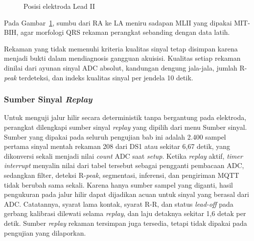 \begin{figure}[!ht]
  \centering
  \caption{Posisi elektroda Lead II}
  \label{fig:4-elektroda}
\end{figure}

Pada Gambar~\ref{fig:4-elektroda}, sumbu dari RA ke LA meniru sadapan MLII yang dipakai MIT-BIH, agar morfologi QRS rekaman perangkat sebanding dengan data latih.

Rekaman yang tidak memenuhi kriteria kualitas sinyal tetap disimpan karena menjadi bukti dalam mendiagnosis gangguan akuisisi. Kualitas setiap rekaman dinilai dari ayunan sinyal ADC absolut, kandungan dengung jala-jala, jumlah R-\textit{peak} terdeteksi, dan indeks kualitas sinyal per jendela 10 detik.

\subsubsection{Sumber Sinyal \textit{Replay}}

Untuk menguji jalur hilir secara deterministik tanpa bergantung pada elektroda, perangkat dilengkapi sumber sinyal \textit{replay} yang dipilih dari menu Sumber sinyal. Sumber yang dipakai pada seluruh pengujian bab ini adalah 2.400 sampel pertama sinyal mentah rekaman 208 dari DS1 atau sekitar 6,67 detik, yang dikonversi sekali menjadi nilai \textit{count} ADC saat \textit{setup}. Ketika \textit{replay} aktif, \textit{timer interrupt} menyalin nilai dari tabel tersebut sebagai pengganti pembacaan ADC, sedangkan filter, deteksi R-\textit{peak}, segmentasi, inferensi, dan pengiriman MQTT tidak berubah sama sekali. Karena hanya sumber sampel yang diganti, hasil pengukuran pada jalur hilir dapat dijadikan acuan untuk sinyal yang berasal dari ADC. Catatannya, syarat lama kontak, syarat R-R, dan status \textit{lead-off} pada gerbang kalibrasi dilewati selama \textit{replay}, dan laju detaknya sekitar 1,6 detak per detik. Sumber \textit{replay} rekaman tersimpan juga tersedia, tetapi tidak dipakai pada pengujian yang dilaporkan.

